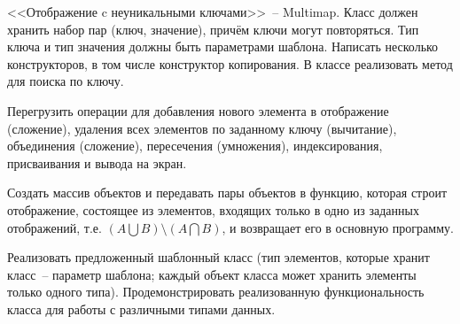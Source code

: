 <<Отображение c неуникальными ключами>>~-- Multimap. Класс должен хранить набор
пар (ключ, значение), причём ключи могут повторяться. Тип ключа и тип значения должны
быть параметрами шаблона. Написать несколько конструкторов, в том числе конструктор
копирования. В классе реализовать метод для поиска по ключу.

Перегрузить операции для
добавления нового элемента в отображение (сложение), удаления всех элементов по
заданному ключу (вычитание), объединения (сложение), пересечения (умножения),
индексирования, присваивания и вывода на экран.

Создать массив объектов и передавать
пары объектов в функцию, которая строит отображение, состоящее из элементов,
входящих только в одно из заданных отображений, т.е. $(A\bigcup B) \setminus (A\bigcap B)$, и возвращает его в
основную программу.

Реализовать предложенный шаблонный класс (тип элементов, которые
хранит класс~-- параметр шаблона; каждый объект класса может хранить
элементы только одного типа). Продемонстрировать реализованную
функциональность класса для работы с различными типами данных.



